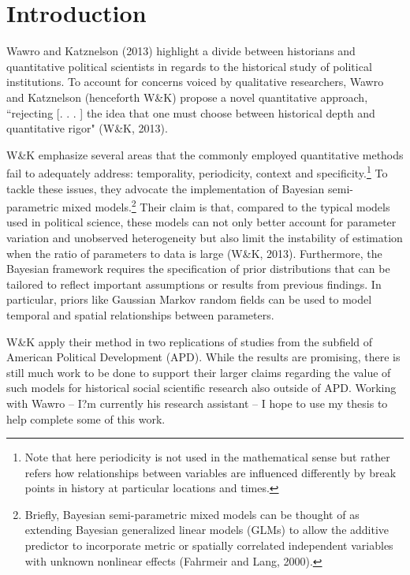 \chapter{Introduction}

Wawro and Katznelson (2013) highlight a divide between historians and quantitative political scientists in regards to the historical study of political institutions. To account for concerns voiced by qualitative researchers, Wawro and Katznelson (henceforth W\&K) propose a novel quantitative approach, ``rejecting [. . . ] the idea that one must choose between historical depth and quantitative rigor" (W\&K, 2013).

W\&K emphasize several areas that the commonly employed quantitative methods fail to adequately address: temporality, periodicity, context and specificity.\footnote{Note that here periodicity is not used in the mathematical sense but rather refers how relationships between variables are influenced differently by break points in history at particular locations and times.}  To tackle these issues, they advocate the implementation of Bayesian semi-parametric mixed models.\footnote{Briefly, Bayesian semi-parametric mixed models can be thought of as extending Bayesian generalized linear models (GLMs) to allow the additive predictor to incorporate metric or spatially correlated independent variables with unknown nonlinear effects (Fahrmeir and Lang, 2000). }  Their claim is that, compared to the typical models used in political science, these models can not only better account for parameter variation and unobserved heterogeneity but also limit the instability of estimation when the ratio of parameters to data is large (W\&K, 2013). Furthermore, the Bayesian framework requires the specification of prior distributions that can be tailored to reflect important assumptions or results from previous findings. In particular, priors like Gaussian Markov random fields can be used to model temporal and spatial relationships between parameters. 

W\&K apply their method in two replications of studies from the subfield of American Political Development (APD). While the results are promising, there is still much work to be done to support their larger claims regarding the value of such models for historical social scientific research also outside of APD. Working with Wawro -- I?m currently his research assistant -- I hope to use my thesis to help complete some of this work. 

